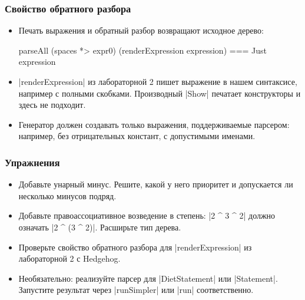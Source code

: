 \documentclass[11pt]{beamer}
\begin{document}
\begin{frame}[fragile]
  \frametitle{Свойство обратного разбора}
  \begin{itemize}
    \item Печать выражения и обратный разбор возвращают исходное дерево:
      \begin{haskellsmall}
        parseAll (spaces *> expr0)
          (renderExpression expression)
          === Just expression
      \end{haskellsmall}
    \item \haskinline|renderExpression| из лабораторной 2 пишет выражение в нашем синтаксисе, например с полными скобками. Производный \haskinline|Show| печатает конструкторы и здесь не подходит.
    \item Генератор должен создавать только выражения, поддерживаемые парсером: например, без отрицательных констант, с допустимыми именами.
  \end{itemize}
\end{frame}

\begin{frame}[fragile]
  \frametitle{Упражнения}
  \begin{itemize}
    \item Добавьте унарный минус. Решите, какой у него приоритет и допускается ли несколько минусов подряд.
    \item Добавьте правоассоциативное возведение в степень: \haskinline|2 ^ 3 ^ 2| должно означать \haskinline|2 ^ (3 ^ 2)|. Расширьте тип дерева.
    \item Проверьте свойство обратного разбора для \haskinline|renderExpression| из лабораторной 2 с Hedgehog.
    \item Необязательно: реализуйте парсер для \haskinline|DietStatement| или \haskinline|Statement|. Запустите результат через \haskinline|runSimpler| или \haskinline|run| соответственно.
  \end{itemize}
\end{frame}
\end{document}
